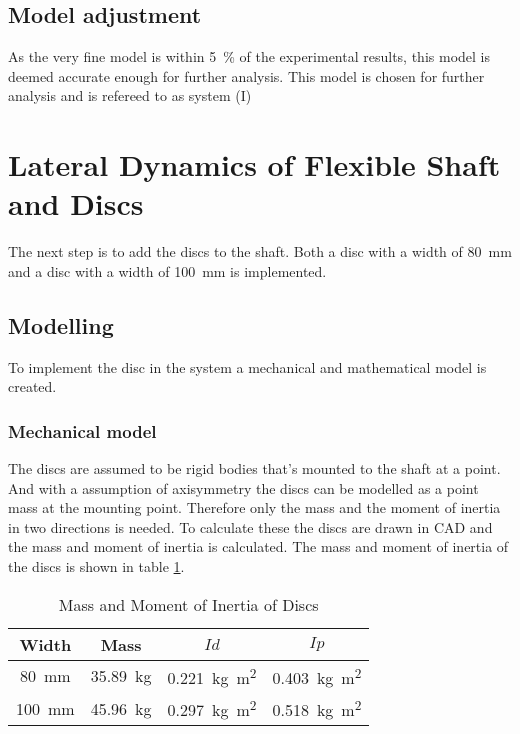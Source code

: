 \subsection{Model adjustment}
As the very fine model is within \SI{5}{\percent} of the experimental results, this model is deemed accurate enough for further analysis. This model is chosen for further analysis and is refereed to as system (I)

\section{Lateral Dynamics of Flexible Shaft and Discs}
The next step is to add the discs to the shaft. Both a disc with a width of \SI{80}{\milli \meter} and a disc with a width of \SI{100}{\milli \meter} is implemented.

\subsection{Modelling}
To implement the disc in the system a mechanical and mathematical model is created.

\subsubsection{Mechanical model}
The discs are assumed to be rigid bodies that's mounted to the shaft at a point. And with a assumption of axisymmetry the discs can be modelled as a point mass at the mounting point. Therefore only the mass and the moment of inertia in two directions is needed. To calculate these the discs are drawn in CAD and the mass and moment of inertia is calculated. The mass and moment of inertia of the discs is shown in table \ref{tab:disc_mass_moment}.
\begin{table}[ht]
    \centering
    \caption{Mass and Moment of Inertia of Discs}
    \label{tab:disc_mass_moment}
    \begin{tabular}{@{}cccc@{}}
        \toprule
        Width    &   Mass                    &   $Id$   &   $Ip$                       \\ \midrule
        \SI{80}{\milli \meter} &  \SI{35.89}{\kilo \gram}   &   \SI{0.221}{\kilo \gram \square \meter} & \SI{0.403}{\kilo \gram \square \meter} \\ 
        \SI{100}{\milli \meter} &   \SI{45.96}{\kilo \gram}   &   \SI{0.297}{\kilo \gram \square \meter} & \SI{0.518}{\kilo \gram \square \meter}\\ \bottomrule
    \end{tabular}
\end{table}

